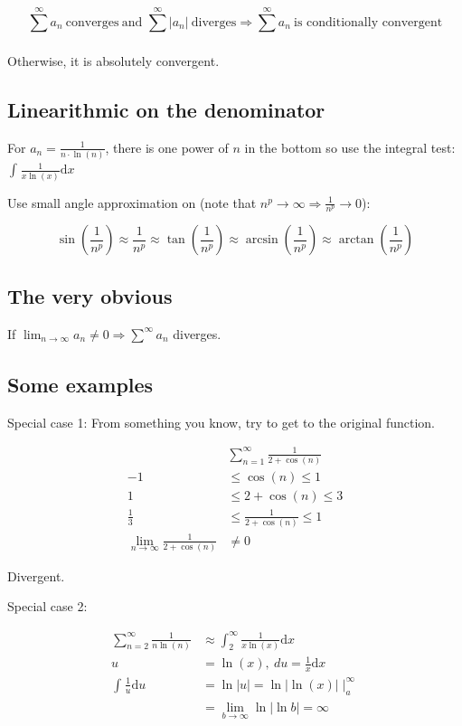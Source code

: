 \documentclass[12pt]{article}
\theoremstyle{plain}
\theoremstyle{remark}
\theoremstyle{definition}
\begin{document}
\[{\sum_{}^{\infty}a_{n}\ \text{converges}\ \text{and\ }\sum_{}^{\infty}\left| a_{n} \right|\ \text{diverges} }{\Rightarrow \sum_{}^{\infty}a_{n}\ \text{is\ conditionally\ convergent}} \]

Otherwise, it is absolutely convergent.


\subsection{Linearithmic on the
denominator}

For \(a_{n} = \frac{1}{n \cdot \ln(n)}\), there is one power of \(n\) in
the bottom so use the integral test:
\(\int_{}^{}\frac{1}{x\ln(x)}\text{d}x\)

Use small angle approximation on (note that
\(n^{p} \rightarrow \infty \Rightarrow \frac{1}{n^{p}} \rightarrow 0\)):

\[\sin\left( \frac{1}{n^{p}} \right) \approx \frac{1}{n^{p}} \approx \tan\left( \frac{1}{n^{p}} \right) \approx \arcsin\left( \frac{1}{n^{p}} \right) \approx \arctan\left( \frac{1}{n^{p}} \right)\]


\subsection{The very obvious}

If
\(\lim_{n \rightarrow \infty}a_{n} \neq 0 \Rightarrow \sum_{}^{\infty}a_{n}\)
diverges.


\subsection{Some examples}

Special case 1: From something you know, try to get to the original
function.

\begin{align*}
&\sum_{n = 1}^{\infty}\frac{1}{2 + \cos(n)} \\
- 1 &\leq \cos(n) \leq 1 \\
1 &\leq 2 + \cos(n) \leq 3 \\
\frac{1}{3} &\leq \frac{1}{2 + \cos(n)} \leq 1 \\
\lim_{n \rightarrow \infty}\frac{1}{2 + \cos(n)} &\neq 0
\end{align*}


Divergent.

Special case 2:

\begin{align*}
\sum_{n = 2}^{\infty}\frac{1}{n\ln(n)} &\approx \int_{2}^{\infty}{\frac{1}{x\ln(x)}\text{d}x} \\
u &= \ln(x),\ du = \frac{1}{x}\text{d}x \\
\int_{}^{}{\frac{1}{u}\text{d}u} &= \ln|u| = \ln\left| \ln(x) \right| \mid_{a}^{\infty} \\
&= \lim_{b \rightarrow \infty}{\ln\left| \ln b \right|} = \infty
\end{align*}
\end{document}
